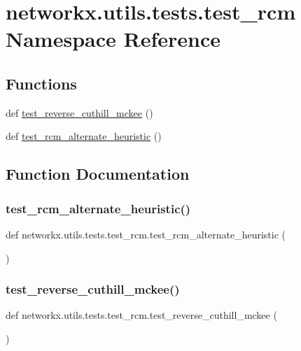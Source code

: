 \hypertarget{namespacenetworkx_1_1utils_1_1tests_1_1test__rcm}{}\section{networkx.\+utils.\+tests.\+test\+\_\+rcm Namespace Reference}
\label{namespacenetworkx_1_1utils_1_1tests_1_1test__rcm}
\subsection*{Functions}
\begin{DoxyCompactItemize}
\item 
def \hyperlink{namespacenetworkx_1_1utils_1_1tests_1_1test__rcm_a625f7e8582a38d1634986bb940e15c2c}{test\+\_\+reverse\+\_\+cuthill\+\_\+mckee} ()
\item 
def \hyperlink{namespacenetworkx_1_1utils_1_1tests_1_1test__rcm_af05797bffcfd24129308efe034fe6703}{test\+\_\+rcm\+\_\+alternate\+\_\+heuristic} ()
\end{DoxyCompactItemize}


\subsection{Function Documentation}
\mbox{\label{namespacenetworkx_1_1utils_1_1tests_1_1test__rcm_af05797bffcfd24129308efe034fe6703}} 
\subsubsection{\texorpdfstring{test\+\_\+rcm\+\_\+alternate\+\_\+heuristic()}{test\_rcm\_alternate\_heuristic()}}
{\footnotesize\ttfamily def networkx.\+utils.\+tests.\+test\+\_\+rcm.\+test\+\_\+rcm\+\_\+alternate\+\_\+heuristic (\begin{DoxyParamCaption}{ }\end{DoxyParamCaption})}

\mbox{\label{namespacenetworkx_1_1utils_1_1tests_1_1test__rcm_a625f7e8582a38d1634986bb940e15c2c}} 
\subsubsection{\texorpdfstring{test\+\_\+reverse\+\_\+cuthill\+\_\+mckee()}{test\_reverse\_cuthill\_mckee()}}
{\footnotesize\ttfamily def networkx.\+utils.\+tests.\+test\+\_\+rcm.\+test\+\_\+reverse\+\_\+cuthill\+\_\+mckee (\begin{DoxyParamCaption}{ }\end{DoxyParamCaption})}


